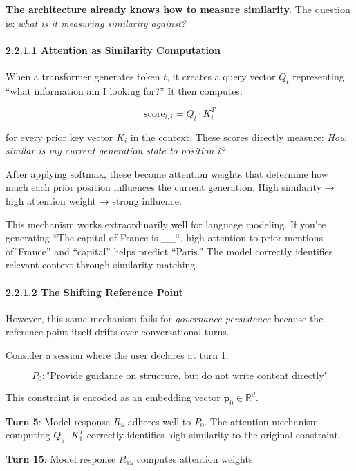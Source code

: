 \textbf{The architecture already knows how to measure similarity.} The
question is: \emph{what is it measuring similarity against?}

\paragraph{2.2.1.1 Attention as Similarity
Computation}\label{attention-as-similarity-computation}

When a transformer generates token \(t\), it creates a query vector
\(Q_t\) representing ``what information am I looking for?'' It then
computes:

\[\text{score}_{t,i} = Q_t \cdot K_i^T\]

for every prior key vector \(K_i\) in the context. These scores directly
measure: \emph{How similar is my current generation state to position
i?}

After applying softmax, these become attention weights that determine
how much each prior position influences the current generation. High
similarity → high attention weight → strong influence.

This mechanism works extraordinarily well for language modeling. If
you're generating ``The capital of France is \_\_``, high attention to
prior mentions of''France'' and ``capital'' helps predict ``Paris.'' The
model correctly identifies relevant context through similarity matching.

\paragraph{2.2.1.2 The Shifting Reference
Point}\label{the-shifting-reference-point}

However, this same mechanism fails for \emph{governance persistence}
because the reference point itself drifts over conversational turns.

Consider a session where the user declares at turn 1:

\[P_0: \text{"Provide guidance on structure, but do not write content directly"}\]

This constraint is encoded as an embedding vector
\(\mathbf{p}_0 \in \mathbb{R}^d\).

\textbf{Turn 5}: Model response \(R_5\) adheres well to \(P_0\). The
attention mechanism computing \(Q_5 \cdot K_1^T\) correctly identifies
high similarity to the original constraint.

\textbf{Turn 15}: Model response \(R_{15}\) computes attention weights:

